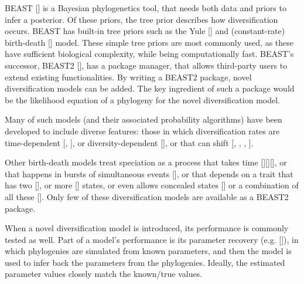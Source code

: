 \documentclass{article}
\begin{document}
BEAST [\cite{drummond2007beast}] is a Bayesian phylogenetics tool, 
that needs both data and priors to infer a posterior.
Of these priors, the tree prior describes how diversification occurs.
BEAST has built-in tree priors such as the Yule [\cite{yule}] and 
(constant-rate) birth-death [\cite{nee1994reconstructed}] model.
These simple tree priors are most commonly used, as these 
have sufficient biological complexity, while being computationally fast.
BEAST's successor, BEAST2 [\cite{bouckaert2014beast}],
has a package manager, that allows third-party users to extend existing 
functionalities.
By writing a BEAST2 package, novel diversification models can be added.
The key ingredient of such a package would be the likelihood equation
of a phylogeny for the novel diversification model.

Many of such models (and their associated probability 
algorithms) have been
developed to include diverse features: those in which diversification rates are 
time-dependent [\cite{nee1994reconstructed}, \cite{rabosky2008explosive}], 
or diversity-dependent [\cite{etienne2011diversity}],
or that can shift [\cite{etienne2012conceptual}, 
\cite{rabosky2014automatic}, \cite{alfaro2009nine}, \cite{laudanno2018sls}].

Other birth-death models treat speciation as a process that takes 
time [\cite{rosindell2010protracted}][\cite{etienne2012prolonging}][\cite{lambert2015reconstructed}], 
or that happens in bursts of simultaneous 
events [\cite{laudanno2018mbd}], or that
depends on a trait that has two [\cite{maddison2007estimating}], 
or more [\cite{fitzjohn2012diversitree}] states,
or even allows concealed states [\cite{beaulieu2016detecting}] 
or a combination of all these [\cite{herrera2018detecting}].
Only few of these diversification models are available as a BEAST2 package.

When a novel diversification model is introduced,
its performance is commonly tested as well.
Part of a model's performance is its parameter 
recovery (e.g. [\cite{etienne2014estimating}]),
in which phylogenies are simulated from known parameters, 
and then the model is used to infer back the parameters from the phylogenies.
Ideally, the estimated parameter values closely match the known/true values.
\end{document}
